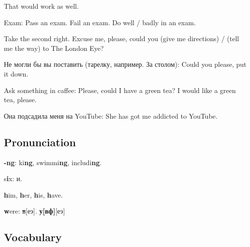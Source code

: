 \documentclass[10pt,a4paper]{article}
\newlength{\OriginalParIndent}
\begin{document}
\begin{description}[leftmargin=\OriginalParIndent,style=nextline,before={\renewcommand\makelabel[1]{##1 ~--}}]
\item[] That would work as well.
\item[] Exam: Pass an exam. Fail an exam. Do well / badly in an exam.
\item[] Take the second right. Excuse me, please, could you (give me directions) /
        (tell me the way) to The London Eye?
\item[] Не могли бы вы поставить (тарелку, например. За столом): Could you please, put it down.
\item[] Ask something in caffee: Please, could I have a green tea? I would like a green tea, please.
\item[] Она подсадила меня на YouTube: She has got me addicted to YouTube.
\end{description}


\subsection{Pronunciation}
\begin{description}[leftmargin=\OriginalParIndent,style=nextline,before={\renewcommand\makelabel[1]{##1 ~--}}]
\item[] \textbf{-ng}: ki\textbf{ng}, swimmi\textbf{ng}, includi\textbf{ng}.
\item[] s\textbf{i}x: и.
\item[] \textbf{h}im, \textbf{h}er, \textbf{h}is, \textbf{h}ave.
\item[] \textbf{w}ere: \sout{в}[еэ]. \textbf{у[вф]}[еэ]
\end{description}



\subsection{Vocabulary}
\end{document}
